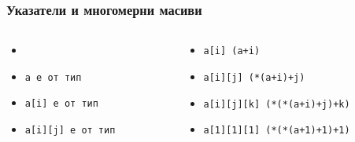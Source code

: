 \documentclass[alsotrans]{beamerswitch}
\begin{document}
\begin{frame}
  \frametitle{Указатели и многомерни масиви}

  \small
  \begin{columns}[T,onlytextwidth]
    \begin{column}{.48\textwidth}
      \begin{itemize}[<+->]
        \setlength{\itemindent}{-1em}
      \item {}
      \item \tt a е от тип 
      \item \tt{a[i]} е от тип 
      \item \tt{a[i][j]} е от тип 
      \end{itemize}
    \end{column}
    \begin{column}{.52\textwidth}
      \begin{itemize}[<+->]
        \setlength{\itemindent}{-1em}
      \item \tt{a[i] \eqv *(a+i)}
      \item \tt{a[i][j] \eqv *(*(a+i)+j)}
      \item \tt{a[i][j][k] \eqv *(*(*(a+i)+j)+k)}
      \item \tt{a[1][1][1] \eqv *(*(*(a+1)+1)+1)}
      \end{itemize}
    \end{column}
  \end{columns}
  \vspace{2em}
  \begin{center}
  \end{center}
\end{frame}
\end{document}
